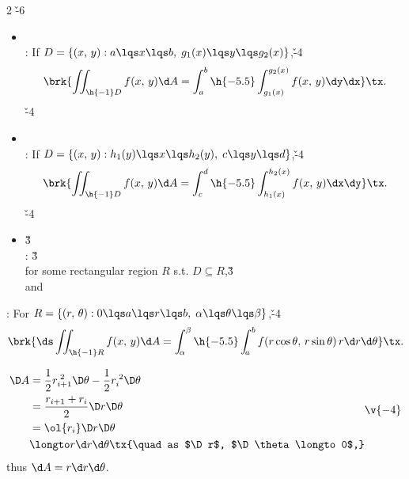 \documentclass[dvipdfmx,a4paper,titlepage,9pt]{jsarticle}
\begin{document}
\begin{multicols*}{2}
\v{-6}
\begin{itemize}[label={-}]
\item{}\\
: If $D=\{(x,\,y):a\lqs x\lqs b,\;g_1(x)\lqs y\lqs g_2(x)\}$,\v{-4}
$$\brk{\iint_{\h{-1}D}f(x,\,y)\d A=\int_a^b\h{-5.5}\int_{g_1(x)}^{g_2(x)}f(x,\,y)\dy\dx}\tx.$$\;\v{-4}

\item{}\\
: If $D=\{(x,\,y):h_1(y)\lqs x\lqs h_2(y),\;c\lqs y\lqs d\}$,\v{-4}
$$\brk{\iint_{\h{-1}D}f(x,\,y)\d A=\int_c^d\h{-5.5}\int_{h_1(x)}^{h_2(x)}f(x,\,y)\dx\dy}\tx.$$\;\v{-4}

\item{}\v3\\
: \v3\\
\;\;for some rectangular region $R$ s.t. $D\subseteq R$,\v3\\
\;\;and 
\end{itemize}

\newpage


: For $R=\{(r,\,\theta):0\lqs a\lqs r\lqs b,\;\alpha\lqs\theta\lqs\beta\}$,\v{-4}
$$\brk{\ds\iint_{\h{-1}R}f(x,\,y)\d A=\int_{\!\alpha}^\beta\h{-5.5}\int_{\!a}^b f(r\cos\theta,\,r\sin\theta)\,r\d r\d\theta}\tx.$$

\begin{Pfbox}[($\!\d A=r\d r\d\theta$)]
$$\begin{aligned}
\D A&=\frac12r_{i+1}^{\;2}\D\theta-\frac12r_i^{\;2}\D\theta\\
&=\frac{r_{i+1}+r_i}2\D r\D\theta\\
&=\ol{r_i}\D r\D\theta\\
&\longto r\d r\d\theta\tx{\quad as $\D r$, $\D\theta\longto 0$,}
\end{aligned}\v{-4}$$
thus $\d A=r\d r\d\theta$.
\end{Pfbox}

\;



\end{multicols*}
\end{document}
